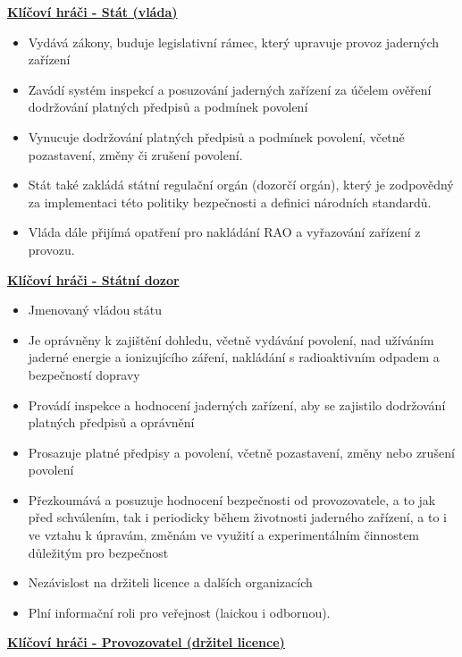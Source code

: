 \underline{\textbf{Klíčoví hráči - Stát (vláda)}}

\begin{itemize}
    \item Vydává zákony, buduje legislativní rámec, který upravuje provoz jaderných zařízení
    \item Zavádí systém inspekcí a posuzování jaderných zařízení za účelem ověření dodržování platných předpisů a podmínek povolení
    \item Vynucuje dodržování platných předpisů a podmínek povolení, včetně pozastavení, změny či zrušení povolení.
    \item Stát také zakládá státní regulační orgán (dozorčí orgán), který je zodpovědný za implementaci této politiky bezpečnosti a definici národních standardů.
    \item Vláda dále přijímá opatření pro nakládání RAO a vyřazování zařízení z provozu.
\end{itemize}

\underline{\textbf{Klíčoví hráči - Státní dozor}}

\begin{itemize}
    \item Jmenovaný vládou státu
    \item Je oprávněny k zajištění dohledu, včetně vydávání povolení, nad užíváním jaderné energie a ionizujícího záření,
nakládání s radioaktivním odpadem a bezpečností dopravy
    \item Provádí inspekce a hodnocení jaderných zařízení, aby se zajistilo dodržování platných předpisů a oprávnění
    \item Prosazuje platné předpisy a povolení, včetně pozastavení, změny nebo zrušení povolení
    \item Přezkoumává a posuzuje hodnocení bezpečnosti od provozovatele, a to jak před schválením, tak i periodicky během
životnosti jaderného zařízení, a to i ve vztahu k úpravám, změnám ve využití a experimentálním činnostem důležitým
pro bezpečnost
\item Nezávislost na držiteli licence a dalších organizacích
\item Plní informační roli pro veřejnost (laickou i odbornou).
\end{itemize}

\underline{\textbf{Klíčoví hráči - Provozovatel (držitel licence)}}

